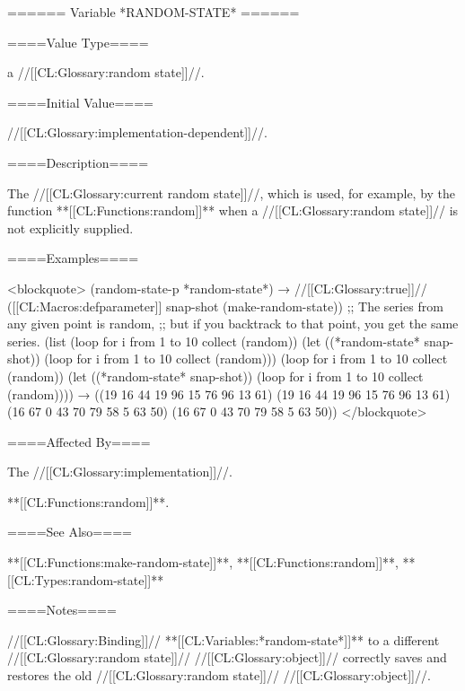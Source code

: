 ====== Variable *RANDOM-STATE* ======

====Value Type====

a //[[CL:Glossary:random state]]//.

====Initial Value====

//[[CL:Glossary:implementation-dependent]]//.

====Description====

The //[[CL:Glossary:current random state]]//, which is used, for example, by the function **[[CL:Functions:random]]** when a //[[CL:Glossary:random state]]// is not explicitly supplied.

====Examples====

<blockquote> (random-state-p *random-state*) → //[[CL:Glossary:true]]// ([[CL:Macros:defparameter]] snap-shot (make-random-state)) ;; The series from any given point is random, ;; but if you backtrack to that point, you get the same series. (list (loop for i from 1 to 10 collect (random)) (let ((*random-state* snap-shot)) (loop for i from 1 to 10 collect (random))) (loop for i from 1 to 10 collect (random)) (let ((*random-state* snap-shot)) (loop for i from 1 to 10 collect (random)))) → ((19 16 44 19 96 15 76 96 13 61) (19 16 44 19 96 15 76 96 13 61) (16 67 0 43 70 79 58 5 63 50) (16 67 0 43 70 79 58 5 63 50)) </blockquote>

====Affected By====

The //[[CL:Glossary:implementation]]//.

**[[CL:Functions:random]]**.

====See Also====

**[[CL:Functions:make-random-state]]**, **[[CL:Functions:random]]**, **[[CL:Types:random-state]]**

====Notes====

//[[CL:Glossary:Binding]]// **[[CL:Variables:*random-state*]]** to a different //[[CL:Glossary:random state]]// //[[CL:Glossary:object]]// correctly saves and restores the old //[[CL:Glossary:random state]]// //[[CL:Glossary:object]]//.


